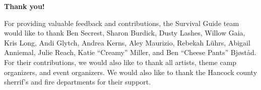 
\clearpage

\vspace*{\fill}
\begin{center}
\Large
\textbf{Thank you!}
\end{center}



\shapepar{\heartshape}
For providing valuable feedback and contributions, the Survival Guide team would like to thank Ben Secrest, Sharon Burdick, Dusty Lashes, Willow Gaia, Kris Long, Andi Glytch, Andrea Kerns, Aley Maurizio, Rebekah Lührs, Abigail Anniemal, Julie Reach,  Katie ``Creamy'' Miller, and Ben ``Cheese Pants'' Bj{\o}st{\aa}d. For their contributions, we would also like to thank all artists, theme camp organizers, and event organizers.  We would also like to thank the Hancock county sherrif's and fire departments for their support.

\vspace*{\fill}